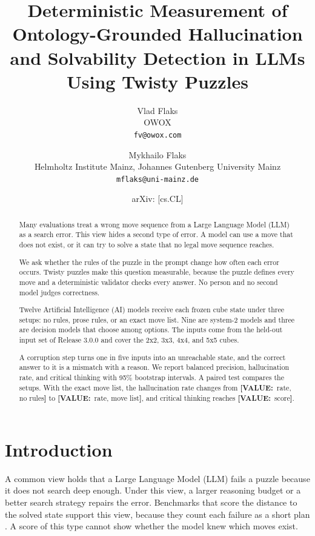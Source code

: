\documentclass[10pt,twocolumn,letterpaper]{article}
\title{Deterministic Measurement of Ontology-Grounded Hallucination and Solvability Detection in LLMs Using Twisty Puzzles}
\author{%
  Vlad Flaks\\ OWOX\\ \texttt{fv@owox.com}
  \and
  Mykhailo Flaks\\ Helmholtz Institute Mainz, Johannes Gutenberg University Mainz\\ \texttt{mflaks@uni-mainz.de}
}
\date{\todo{date of submission} \quad arXiv:\val{ID} [cs.CL]}
\newcommand{\val}[1]{{\color{red!70!black}\textbf{[VALUE:}~#1\textbf{]}}}
\begin{document}
\maketitle

\begin{abstract}
Many evaluations treat a wrong move sequence from a Large Language Model (LLM) as a search error. This view hides a second type of error. A model can use a move that does not exist, or it can try to solve a state that no legal move sequence reaches.

We ask whether the rules of the puzzle in the prompt change how often each error occurs. Twisty puzzles make this question measurable, because the puzzle defines every move and a deterministic validator checks every answer. No person and no second model judges correctness.

Twelve Artificial Intelligence (AI) models receive each frozen cube state under three setups: no rules, prose rules, or an exact move list. Nine are system-2 models and three are decision models that choose among options. The inputs come from the held-out input set of Release 3.0.0 and cover the 2x2, 3x3, 4x4, and 5x5 cubes.

A corruption step turns one in five inputs into an unreachable state, and the correct answer to it is a mismatch with a reason. We report balanced precision, hallucination rate, and critical thinking with 95\% bootstrap intervals. A paired test compares the setups. With the exact move list, the hallucination rate changes from \val{rate, no rules} to \val{rate, move list}, and critical thinking reaches \val{score}.
\end{abstract}

\section{Introduction}\label{sec:intro}
A common view holds that a Large Language Model (LLM) fails a puzzle because it does not search deep enough. Under this view, a larger reasoning budget or a better search strategy repairs the error. Benchmarks that score the distance to the solved state support this view, because they count each failure as a short plan \citep{cubebench,illusion}. A score of this type cannot show whether the model knew which moves exist.
\end{document}
